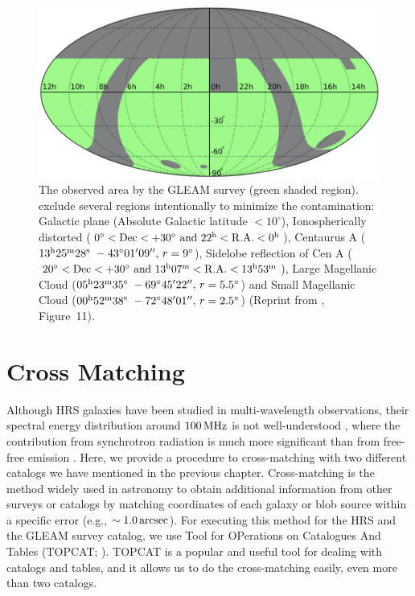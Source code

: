 \begin{figure}[htbp]
	\centering
	\includegraphics[width=.7\linewidth]{Chapter_3/Figures/HurleyWalker_Figure11.png}
    \caption[The observing area of the GLEAM survey]{\label{fig:HurleyWalker2017_figure11}
        The observed area by the GLEAM survey (green shaded region).
        \citet{Hurley-Walker2017a} exclude several regions intentionally to minimize the contamination:
        Galactic plane (Absolute Galactic latitude $<10^{\circ}$),
        Ionospherically distorted ($0^{\circ} < \mathrm{Dec} < +30^{\circ}\ \mathrm{and}\ 22^{\mathrm{h}} < \mathrm{R.A.} < 0^{\mathrm{h}}$),
        Centaurus A ($13\msu{h}25\msu{m}28\msu{s}\ -43^{\circ}01'09'',\,r=9^{\circ}$),
        Sidelobe reflection of Cen A ($20^{\circ} < \mr{Dec} < +30^{\circ}\ \mr{and}\ 13\msu{h}07\msu{m} < \mr{R.A.} < 13\msu{h}53\msu{m}$),
        Large Magellanic Cloud ($05\msu{h}23\msu{m}35\msu{s}\ -69^{\circ}45'22'',\,r=5.5^{\circ}$) and Small Magellanic Cloud ($00\msu{h}52\msu{m}38\msu{s}\ -72^{\circ}48'01'',\,r=2.5^{\circ}$)
        (Reprint from \citealt{Hurley-Walker2017a}, Figure~11).
    }
\end{figure}





\section{Cross Matching}\label{sec:crossmatching}
Although HRS galaxies have been studied in multi-wavelength observations, their spectral energy distribution around $100\,\mathrm{MHz}$ is not well-understood \citep{Ciesla2014}, where the contribution from synchrotron radiation is much more significant than from free-free emission \citep{Condon1992a}.
Here, we provide a procedure to cross-matching with two different catalogs we have mentioned in the previous chapter.
Cross-matching is the method widely used in astronomy to obtain additional information from other surveys or catalogs by matching coordinates of each galaxy or blob source within a specific error (e.g., $\sim 1.0\,\mathrm{arcsec}$).
For executing this method for the HRS and the GLEAM survey catalog, we use Tool for OPerations on Catalogues And Tables (TOPCAT\@; \citealt{Taylor2009}).
TOPCAT is a popular and useful tool for dealing with catalogs and tables, and it allows us to do the cross-matching easily, even more than two catalogs.

